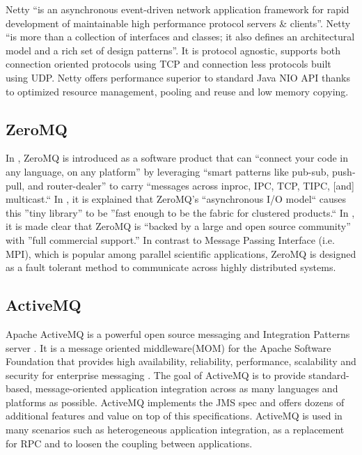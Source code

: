      Netty \cite{www-netty} ``is an asynchronous event-driven network
     application framework for rapid development of maintainable high
     performance protocol servers \& clients''. Netty \cite{netty-book}
     ``is more than a collection of interfaces and classes; it also
     defines an architectural model and a rich set of design
     patterns''. It is protocol agnostic, supports both connection
     oriented protocols using TCP and connection less protocols built
     using UDP. Netty offers performance superior to standard Java NIO
     API thanks to optimized resource management, pooling and reuse
     and low memory copying.
     
\subsection{ZeroMQ}

     In \cite{www-zeromq}, ZeroMQ is introduced as a software product 
     that can ``connect your code in any language, on any platform'' by 
     leveraging ``smart patterns like pub-sub, push-pull, and 
     router-dealer'' to carry ``messages across inproc, IPC, TCP, TIPC, 
     [and] multicast.`` In \cite{www-zeromq2}, it is explained that 
     ZeroMQ's ``asynchronous I/O model`` causes this ''tiny library'' to 
     be ''fast enough to be the fabric for clustered products.`` In 
     \cite{www-zeromq}, it is made clear that ZeroMQ is ``backed by a 
     large and open source community'' with ''full commercial support.'' 
     In contrast to Message Passing Interface (i.e. MPI), which is 
     popular among parallel scientific applications, ZeroMQ is 
     designed as a fault tolerant method to communicate across highly 
     distributed systems. 

\subsection{ActiveMQ}

     Apache ActiveMQ is a powerful open source messaging and
     Integration Patterns server \cite{www-activeMQ}. It is a message
     oriented middleware(MOM) for the Apache Software Foundation that
     provides high availability, reliability, performance, scalability
     and security for enterprise messaging \cite{ActiveMQ-book}. The
     goal of ActiveMQ is to provide standard-based, message-oriented
     application integration across as many languages and platforms as
     possible. ActiveMQ implements the JMS spec and offers dozens of
     additional features and value on top of this
     specifications. ActiveMQ is used in many scenarios such as
     heterogeneous application integration, as a replacement for RPC
     and to loosen the coupling between applications.
     
